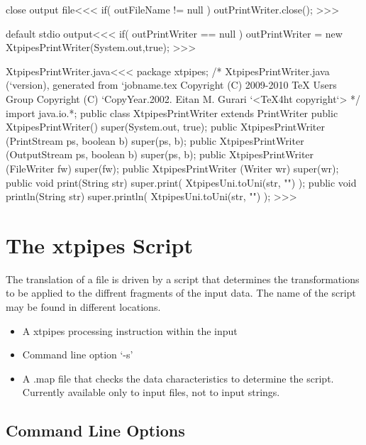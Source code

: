 \documentclass{article}
\begin{document}
{\<close output file\><<<
if( outFileName != null ){
   outPrintWriter.close();
}
>>>

\<default stdio output\><<<
if( outPrintWriter == null ){
   outPrintWriter = new XtpipesPrintWriter(System.out,true);
}
>>>

% 

\<XtpipesPrintWriter.java\><<<
package xtpipes;
/* XtpipesPrintWriter.java (`version), generated from `jobname.tex
   Copyright (C) 2009-2010 TeX Users Group
   Copyright (C) `CopyYear.2002. Eitan M. Gurari
`<TeX4ht copyright`> */
import java.io.*;
public class XtpipesPrintWriter extends PrintWriter {
   public XtpipesPrintWriter() {
     super(System.out, true);
   }
   public XtpipesPrintWriter (PrintStream ps, boolean b){
     super(ps, b);
   }
   public XtpipesPrintWriter (OutputStream ps, boolean b){
     super(ps, b);
   }
   public XtpipesPrintWriter (FileWriter fw){
     super(fw);
   }
   public XtpipesPrintWriter (Writer wr){
     super(wr);
   }
   public void print(String str) {
     super.print( XtpipesUni.toUni(str, "") );
   }
   public void println(String str) {
     super.println( XtpipesUni.toUni(str, "") );
}  }
>>>





\section{The xtpipes Script}


The translation of a file is driven by a script that determines the
transformations to be applied to the diffrent fragments of the input
data.  The name of the script may be found in different locations.

\begin{itemize}
\item
A xtpipes processing instruction within the input
\item
Command line option `-s'
\item
A .map  file that checks the data characteristics to determine the
script. Currently available only to input files, not to input strings.
\end{itemize}



\subsection{Command Line Options}


}
\end{document}
